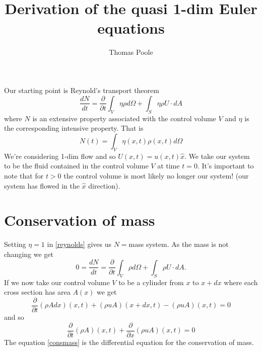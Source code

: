 \documentclass[12pt]{article}
\title{Derivation of the quasi 1-dim Euler equations}
\author{Thomas Poole}
\begin{document}
\maketitle

Our starting point is Reynold's transport theorem
\begin{equation}
\label{reynolds}
	\frac{dN}{dt} = \frac{\partial}{\partial t}\int_{V}\eta\rho d\Omega + \int_{S}\eta\rho U\cdot dA
\end{equation}
where $N$ is an extensive property associated with the control volume $V$ and $\eta$ is the corresponding intensive property. That is
$$
 N(t) = \int_{V}\eta(x,t)\rho(x,t) d\Omega 
$$
We're considering 1-dim flow and so $U(x,t)=u(x,t)\hat{x}$. We take our system to be the fluid contained in the control volume $V$ at time $t = 0$. It's important to note that for $t > 0$ the control volume is most likely no longer our system! (our system has flowed in the $\hat{x}$ direction).

\section{Conservation of mass}
Setting $\eta = 1$ in \eqref{reynolds} gives us $N = $mass system. As the mass is not changing we get
$$
 0 = \frac{dN}{dt} =  \frac{\partial}{\partial t}\int_{V}\rho d\Omega + \int_{S}\rho U\cdot dA.
$$
If we now take our control volume $V$ to be a cylinder from $x$ to $x + dx$ where each cross section has area $A(x)$ we get
$$ 
\frac{\partial}{\partial t}(\rho Adx)(x,t) + (\rho uA)(x+dx,t) - (\rho uA)(x,t) = 0 
$$
and so
\begin{equation}
\label{consmass}
\boxed{\frac{\partial}{\partial t}(\rho A)(x,t) +  \frac{\partial}{\partial x}(\rho uA)(x,t) = 0}
\end{equation}
The equation \eqref{consmass} is the differential equation for the conservation of mass.
\end{document}
